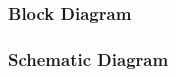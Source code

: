\documentclass{article}
\begin{document}
    \subsubsection{Block Diagram}


    \subsubsection{Schematic Diagram}
\end{document}

